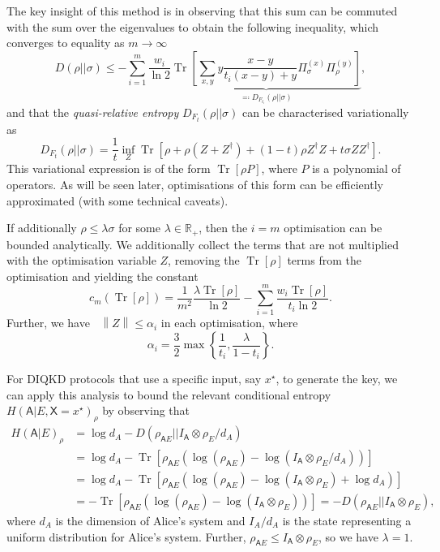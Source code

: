 \documentclass[10pt, a4paper]{article}
\numberwithin{equation}{section} %
\theoremstyle{definition}
\theoremstyle{plain}
\newcommand{\norm}[1]{\mathop{}\left\lVert#1\right\rVert}
\newcommand{\?}{\mathrel{?}} %
\newcommand{\R}{\mathbb{R}} %
\newcommand{\Tr}[2][]{\mathop{\mathrm{Tr}#1}\left[ #2 \right]} %
\newcommand{\crv}[1]{\mathsf{#1}}
\begin{document}
    The key insight of this method is in observing that this sum can be commuted with the sum over the eigenvalues to obtain the following inequality, which converges to equality as \(m\to\infty\)
    \begin{equation}
      D(\rho||\sigma) \leq - \sum_{i=1}^{m} \frac{w_i}{\ln 2} \underbrace{\Tr{ \sum_{x,y} y \frac{x-y}{t_i(x-y)+y} \Pi^{(x)}_{\sigma} \Pi^{(y)}_{\rho} }}_{\eqqcolon D_{F_{t_i}}(\rho||\sigma)},\label{eqn:re_from_qre}
    \end{equation}
    and that the \emph{quasi-relative entropy} \(D_{F_{t}}(\rho||\sigma)\) can be characterised variationally as
    \begin{equation}
      D_{F_{t}}(\rho||\sigma) = \frac{1}{t} \inf_Z \Tr{ \rho + \rho(Z + Z^{\dagger}) + (1-t)\rho{}Z^{\dagger}Z + t\sigma{}ZZ^{\dagger} }.\label{eqn:qre_var}
    \end{equation}
  This variational expression is of the form \(\Tr{\rho P}\), where \(P\) is a polynomial of operators. As will be seen later, optimisations of this form can be efficiently approximated (with some technical caveats).

If additionally \(\rho \leq \lambda\sigma\) for some \(\lambda \in \R_+\), then the \(i=m\) optimisation can be bounded analytically. We additionally collect the terms that are not multiplied with the optimisation variable \(Z\), removing the \(\Tr{\rho}\) terms from the optimisation and yielding the constant
    \begin{equation}
    c_m(\Tr{\rho}) = \frac{1}{m^2} \frac{\lambda \Tr{\rho}}{\ln 2} - \sum_{i=1}^m \frac{w_i \Tr{\rho}}{t_i \ln 2}.
    \end{equation}
    Further, we have \(\norm{Z} \leq \alpha_i\) in each optimisation, where
    \begin{equation}\label{eqn:qre_bound}
      \alpha_i = \frac{3}{2} \max\left\{\frac{1}{t_i}, \frac{\lambda}{1-t_i}\right\}.
    \end{equation}

    For DIQKD protocols that use a specific input, say \(x^{\star}\), to generate the key, we can apply this analysis to bound the relevant conditional entropy \(H{(\crv{A}|E, \crv{X}=x^{\star})}_{\rho}\) by observing that
    \begin{align*}
      H{(\crv{A}|E)}_{\rho} &= \log d_A - D(\rho_{\crv{A}E}||I_{\crv{A}}\otimes\rho_{E} / d_A) \\
                            &= \log d_A - \Tr{\rho_{\crv{A}E}(\log(\rho_{\crv{A}E}) - \log(I_{\crv{A}}\otimes\rho_{E} / d_A))} \\
                            &= \log d_A - \Tr{\rho_{\crv{A}E}(\log(\rho_{\crv{A}E}) - \log(I_{\crv{A}}\otimes\rho_{E}) + \log d_A)} \\
                            &= -\Tr{\rho_{\crv{A}E}(\log(\rho_{\crv{A}E}) - \log(I_{\crv{A}}\otimes\rho_{E}))} = -D(\rho_{\crv{A}E}||I_{\crv{A}}\otimes\rho_{E}),
    \end{align*}
    where \(d_A\) is the dimension of Alice's system and \(I_A/d_A\) is the state representing a uniform distribution for Alice's system. Further, \(\rho_{\crv{A}E} \leq I_{\crv{A}} \otimes \rho_{E}\), so we have \(\lambda = 1\).
\end{document}
